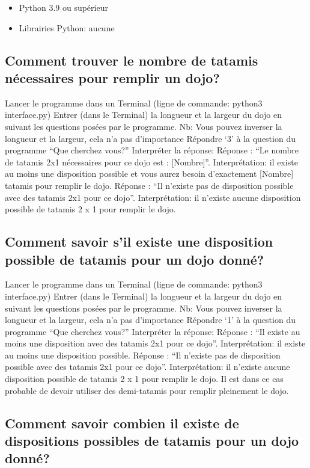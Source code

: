 \begin{itemize}
    \item Python 3.9 ou supérieur
    \item Librairies Python: aucune
\end{itemize}

\subsection{Comment trouver le nombre de tatamis nécessaires pour remplir un dojo?}

Lancer le programme dans un Terminal (ligne de commande: python3 interface.py)
Entrer (dans le Terminal) la longueur et la largeur du dojo en suivant les questions posées par le programme. Nb: Vous pouvez inverser la longueur et la largeur, cela n’a pas d’importance
Répondre ‘3’ à la question du programme “Que cherchez vous?”
Interpréter la réponse:
Réponse : “Le nombre de tatamis 2x1 nécessaires pour ce dojo est : [Nombre]”. Interprétation: il existe au moins une disposition possible et vous aurez besoin d’exactement [Nombre] tatamis pour remplir le dojo.
Réponse : “Il n'existe pas de disposition possible avec des tatamis 2x1 pour ce dojo”. Interprétation: il n’existe aucune disposition possible de tatamis 2 x 1 pour remplir le dojo.

\subsection{Comment savoir s’il existe une disposition possible de tatamis pour un dojo donné?}

Lancer le programme dans un Terminal (ligne de commande: python3 interface.py)
Entrer (dans le Terminal) la longueur et la largeur du dojo en suivant les questions posées par le programme. Nb: Vous pouvez inverser la longueur et la largeur, cela n’a pas d’importance
Répondre ‘1’ à la question du programme “Que cherchez vous?”
Interpréter la réponse:
Réponse : “Il existe au moins une disposition avec des tatamis 2x1 pour ce dojo”. Interprétation: il existe au moins une disposition possible.
Réponse : “Il n’existe pas de disposition possible avec des tatamis 2x1 pour ce dojo”. Interprétation: il n’existe aucune disposition possible de tatamis 2 x 1 pour remplir le dojo. Il est dans ce cas probable de devoir utiliser des demi-tatamis pour remplir pleinement le dojo.


\subsection{Comment savoir combien il existe de dispositions possibles de tatamis pour un dojo donné?}

